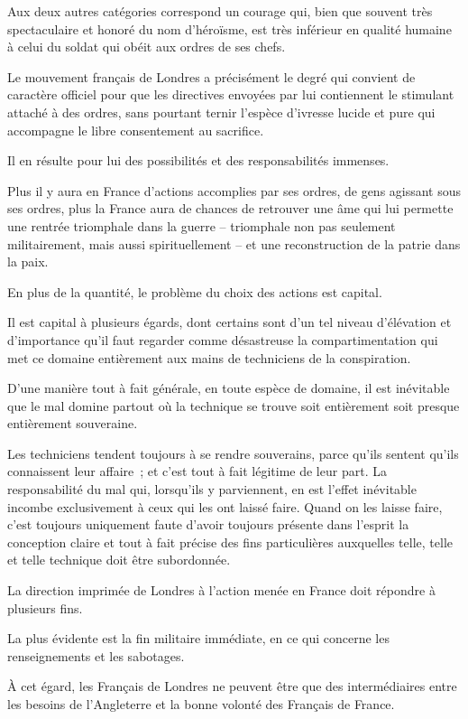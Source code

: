 \documentclass[french,twoside]{book} %
\begin{document}
Aux deux autres catégories correspond un courage qui, bien que souvent très spectaculaire et honoré du nom d'héroïsme, est très inférieur en qualité humaine à celui du soldat qui obéit aux ordres de ses chefs.\par
Le mouvement français de Londres a précisément le degré qui convient de caractère officiel pour que les directives envoyées par lui contiennent le stimulant attaché à des ordres, sans pourtant ternir l'espèce d'ivresse lucide et pure qui accompagne le libre consentement au sacrifice.\par
Il en résulte pour lui des possibilités et des responsabilités immenses.\par
Plus il y aura en France d'actions accomplies par ses ordres, de gens agissant sous ses ordres, plus la France aura de chances de retrouver une âme qui lui permette une rentrée triomphale dans la guerre – triomphale non pas seulement militairement, mais aussi spirituellement – et une reconstruction de la patrie dans la paix.\par
En plus de la quantité, le problème du choix des actions est capital.\par
Il est capital à plusieurs égards, dont certains sont d'un tel niveau d'élévation et d'importance qu'il faut regarder comme désastreuse la compartimentation qui met ce domaine entièrement aux mains de techniciens de la conspiration.\par
D'une manière tout à fait générale, en toute espèce de domaine, il est inévitable que le mal domine partout où la technique se trouve soit entièrement soit presque entièrement souveraine.\par
Les techniciens tendent toujours à se rendre souverains, parce qu'ils sentent qu'ils connaissent leur affaire ; et c'est tout à fait légitime de leur part. La responsabilité du mal qui, lorsqu'ils y parviennent, en est l'effet inévitable incombe exclusivement à ceux qui les ont laissé faire. Quand on les laisse faire, c'est toujours uniquement faute d'avoir toujours présente dans l'esprit la conception claire et tout à fait précise des fins particulières auxquelles telle, telle et telle technique doit être subordonnée.\par
La direction imprimée de Londres à l'action menée en France doit répondre à plusieurs fins.\par
La plus évidente est la fin militaire immédiate, en ce qui concerne les renseignements et les sabotages.\par
À cet égard, les Français de Londres ne peuvent être que des intermédiaires entre les besoins de l'Angleterre et la bonne volonté des Français de France.\par
\end{document}
